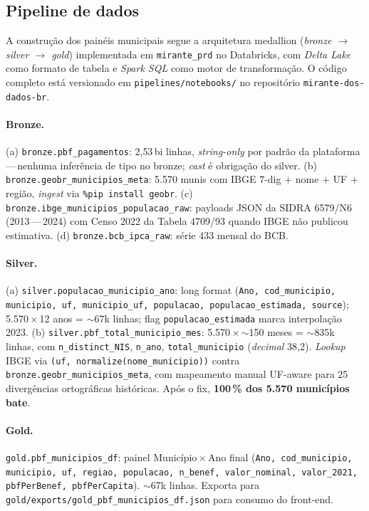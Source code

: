 \documentclass[12pt,a4paper,oneside]{article}
\begin{document}
\subsection{Pipeline de dados}\label{sec:metodo:pipeline}

A construção dos painéis municipais segue a arquitetura medallion
(\textit{bronze \(\to\) silver \(\to\) gold}) implementada em
\texttt{mirante\_prd} no Databricks, com \textit{Delta Lake} como formato
de tabela e \textit{Spark SQL} como motor de transformação. O código
completo está versionado em \texttt{pipelines/notebooks/} no repositório
\texttt{mirante-dos-dados-br}.

\paragraph{Bronze.} (a) \texttt{bronze.pbf\_pagamentos}: 2{,}53\,bi linhas,
\textit{string-only} por padrão da plataforma\,---\,nenhuma inferência de
tipo no bronze; \textit{cast} é obrigação do silver. (b)
\texttt{bronze.geobr\_municipios\_meta}: 5.570 munis com IBGE 7-dig +
nome + UF + região, \textit{ingest} via \texttt{\%pip install geobr}. (c)
\texttt{bronze.ibge\_municipios\_populacao\_raw}: payloads JSON da SIDRA
6579/N6 (2013\,---\,2024) com Censo 2022 da Tabela 4709/93 quando IBGE não
publicou estimativa. (d) \texttt{bronze.bcb\_ipca\_raw}: série 433 mensal
do BCB.

\paragraph{Silver.} (a) \texttt{silver.populacao\_municipio\_ano}: long
format (\texttt{Ano, cod\_municipio, municipio, uf, municipio\_uf,
populacao, populacao\_estimada, source}); 5.570\,$\times$\,12 anos =
$\sim$67k linhas; flag \texttt{populacao\_estimada} marca interpolação 2023.
(b) \texttt{silver.pbf\_total\_municipio\_mes}: 5.570\,$\times$\,$\sim$150
meses = $\sim$835k linhas, com \texttt{n\_distinct\_NIS}, \texttt{n\_ano},
\texttt{total\_municipio} (\textit{decimal} 38,2). \textit{Lookup} IBGE via
\texttt{(uf, normalize(nome\_municipio))} contra
\texttt{bronze.geobr\_municipios\_meta}, com mapeamento manual UF-aware
para 25 divergências ortográficas históricas. Após o fix, \textbf{100\,\% dos
5.570 municípios bate}.

\paragraph{Gold.} \texttt{gold.pbf\_municipios\_df}: painel
Município\,$\times$\,Ano final
(\texttt{Ano, cod\_municipio, municipio, uf, regiao, populacao,
n\_benef, valor\_nominal, valor\_2021, pbfPerBenef, pbfPerCapita}). $\sim$67k
linhas. Exporta para \texttt{gold/exports/gold\_pbf\_municipios\_df.json}
para consumo do front-end.
\end{document}
